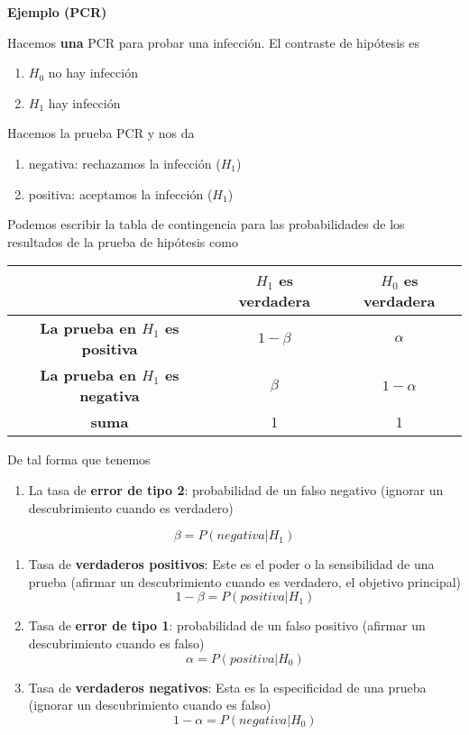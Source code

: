 \documentclass[
]{book}
\providecommand{\tightlist}{%
  \setlength{\itemsep}{0pt}\setlength{\parskip}{0pt}}
\begin{document}
\textbf{Ejemplo (PCR)}

Hacemos \textbf{una} PCR para probar una infección. El contraste de hipótesis es

\begin{enumerate}
\def\labelenumi{\alph{enumi}.}
\tightlist
\item
  \(H_0\) no hay infección
\item
  \(H_1\) hay infección
\end{enumerate}

Hacemos la prueba PCR y nos da

\begin{enumerate}
\def\labelenumi{\roman{enumi}.}
\tightlist
\item
  negativa: rechazamos la infección (\(H_1\))
\item
  positiva: aceptamos la infección (\(H_1\))
\end{enumerate}

Podemos escribir la tabla de contingencia para las probabilidades de los resultados de la prueba de hipótesis como

\begin{longtable}[]{@{}ccc@{}}
\toprule
& \(H_1\) es verdadera & \(H_0\) es verdadera \\
\midrule
\endhead
\textbf{La prueba en \(H_1\) es positiva} & \(1-\beta\) & \(\alpha\) \\
\textbf{La prueba en \(H_1\) es negativa} & \(\beta\) & \(1-\alpha\) \\
\textbf{suma} & 1 & 1 \\
\bottomrule
\end{longtable}

De tal forma que tenemos

\begin{enumerate}
\def\labelenumi{\arabic{enumi}.}
\tightlist
\item
  La tasa de \textbf{error de tipo 2}: probabilidad de un falso negativo (ignorar un descubrimiento cuando es verdadero)
\end{enumerate}

\[\beta=P(negativa|H_1)\]

\begin{enumerate}
\def\labelenumi{\arabic{enumi}.}
\setcounter{enumi}{1}
\item
  Tasa de \textbf{verdaderos positivos}: Este es el poder o la sensibilidad de una prueba (afirmar un descubrimiento cuando es verdadero, el objetivo principal)
  \[1-\beta=P(positiva|H_1)\]
\item
  Tasa de \textbf{error de tipo 1}: probabilidad de un falso positivo (afirmar un descubrimiento cuando es falso)
  \[\alpha=P(positiva|H_0)\]
\item
  Tasa de \textbf{verdaderos negativos}: Esta es la especificidad de una prueba (ignorar un descubrimiento cuando es falso)
  \[1-\alpha=P(negativa|H_0)\]
\end{enumerate}

  
\end{document}

